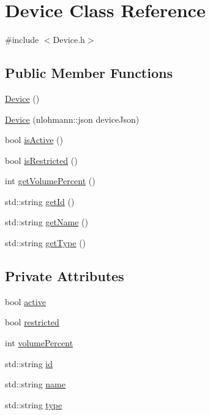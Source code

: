 \hypertarget{class_device}{}\section{Device Class Reference}
\label{class_device}


{\ttfamily \#include $<$Device.\+h$>$}

\subsection*{Public Member Functions}
\begin{DoxyCompactItemize}
\item 
\mbox{\hyperlink{class_device_a64ba12dcc5f4267486c5d545d04dcf68}{Device}} ()
\item 
\mbox{\hyperlink{class_device_a0956ff0cb54658d2b4cc43eaae1c0540}{Device}} (nlohmann\+::json device\+Json)
\item 
bool \mbox{\hyperlink{class_device_a6b2f2b45d71f1ecda445896e0429e22c}{is\+Active}} ()
\item 
bool \mbox{\hyperlink{class_device_a0ea3f1723c41ee958c753ef9b3b1a413}{is\+Restricted}} ()
\item 
int \mbox{\hyperlink{class_device_a13ffb336487ca8f938b1ad0f42259785}{get\+Volume\+Percent}} ()
\item 
std\+::string \mbox{\hyperlink{class_device_aa356c49000a4a7eea1d014dd5245ff51}{get\+Id}} ()
\item 
std\+::string \mbox{\hyperlink{class_device_a7e27b36eae579176707a47b682d84a22}{get\+Name}} ()
\item 
std\+::string \mbox{\hyperlink{class_device_afc4d7d248d4ea70e69129c47d4ef1dc6}{get\+Type}} ()
\end{DoxyCompactItemize}
\subsection*{Private Attributes}
\begin{DoxyCompactItemize}
\item 
bool \mbox{\hyperlink{class_device_ac6c8534a9c755b5ee9affc37771a301d}{active}}
\item 
bool \mbox{\hyperlink{class_device_a86832f8fbd54579dcce93c8470f27377}{restricted}}
\item 
int \mbox{\hyperlink{class_device_a4b984b16ab0c4ca441b531aee1c55ed4}{volume\+Percent}}
\item 
std\+::string \mbox{\hyperlink{class_device_aa07acb3cbc8c6e2cfcfbf1be7f79b4d1}{id}}
\item 
std\+::string \mbox{\hyperlink{class_device_ae779f5ee618677629b71287f3f77f8e8}{name}}
\item 
std\+::string \mbox{\hyperlink{class_device_a06b952ae4a767b7f8fc040915f34e148}{type}}
\end{DoxyCompactItemize}



